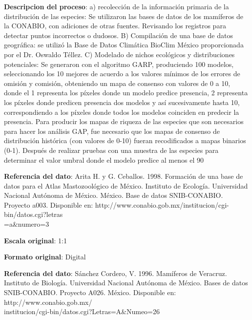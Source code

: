 \documentclass[twoside]{book}
\begin{document}
{\textbf{Descripcion del proceso}: a) recolección de la información primaria de la distribución de las especies: Se utilizaron las bases de datos de los mamíferos de la CONABIO, con adiciones de otras fuentes. Revisando los registros para detectar puntos incorrectos o dudosos. B) Compilación de una base de datos geográfica: se utilizó la Base de Datos Climática BioClim México proporcionada por el Dr. Oswaldo Téllez. C) Modelado de nichos ecológicos y distribuciones potenciales: Se generaron con el algoritmo GARP, produciendo 100 modelos, seleccionando los 10 mejores de acuerdo a los valores mínimos de los errores de omisión y comisión, obteniendo un mapa de consenso con valores de 0 a 10, donde el 1 representa los píxeles donde un modelo predice presencia, 2 representa los píxeles donde predicen presencia dos modelos y así sucesivamente hasta 10, correspondiendo a los píxeles donde todos los modelos coinciden en predecir la presencia. Para producir los mapas de riqueza de las especies que son necesarios para hacer los análisis GAP, fue necesario que los mapas de consenso de distribución histórica (con valores de 0-10) fueran recodificados a mapas binarios (0-1). Después de realizar pruebas con una muestra de las especies para determinar el valor umbral donde el modelo predice al menos el 90%

\textbf{Referencia del dato}: Arita H. y G. Ceballos. 1998. Formación de una base de datos para el Atlas Mastozoológico de México. Instituto de Ecología. Universidad Nacional Autónoma de México. México. Base de datos SNIB-CONABIO. Proyecto a003. Disponible en: http://www.conabio.gob.mx/institucion/cgi-bin/datos.cgi?letras\\=a\&numero=3

\textbf{Escala original}: 1:1

\textbf{Formato original}: Digital

\textbf{Referencia del dato}: Sánchez Cordero, V. 1996. Mamíferos de Veracruz. Instituto de Biología. Universidad Nacional Autónoma de México. Bases de datos SNIB-CONABIO. Proyecto A026. México. Disponible en: http://www.conabio.gob.mx/\\institucion/cgi-bin/datos.cgi?Letras=A\&Numeo=26

}
\end{document}

